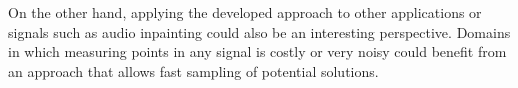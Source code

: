 On the other hand, applying the developed approach to other applications or signals such as audio inpainting \citep{Marafioti2018} could also be an interesting perspective. Domains in which measuring points in any signal is costly or very noisy could benefit from an approach that allows fast sampling of potential solutions.
